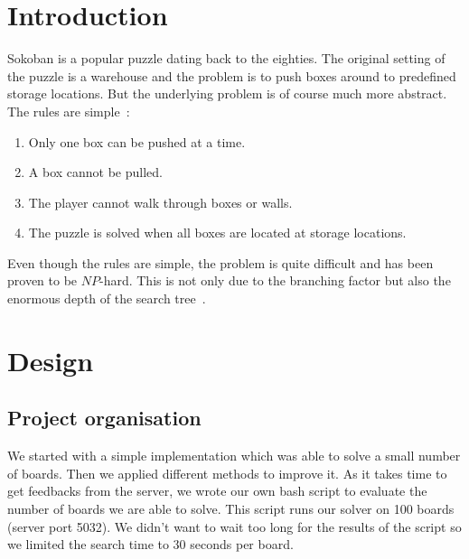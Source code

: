 \documentclass[a4paper,10pt]{article}
\begin{document}
\cleardoublepage
\tableofcontents
\newpage




\section{Introduction}

    Sokoban is a popular puzzle dating back to the eighties.  
    The original setting of the puzzle is a warehouse and the problem is to push boxes
    around to predefined storage locations.  
    But the underlying problem is of course much more abstract.  The rules are simple~\cite{wiki_soko}: 
    \begin{enumerate}[I]
        \item  Only one box can be pushed at a time.
        \item A box cannot be pulled.
        \item The player cannot walk through boxes or walls.
        \item The puzzle is solved when all boxes are located at storage locations.
    \end{enumerate}
    Even though the rules are simple, the problem is quite difficult and has been proven to be $NP$-hard.
    This is not only due to the branching factor but also the 
    enormous depth of the search tree~\cite{wiki_soko}.
    

    
   

\section{Design}
    \subsection{Project organisation}
	We started with a simple implementation which was able to solve a small number of boards. 
	Then we applied different methods to improve it.
	As it takes time to get feedbacks from the server, we wrote our own bash script to evaluate the number of boards we are able to solve.
	This script runs our solver on 100 boards (server port 5032).
	We didn't want to wait too long for the results of the script so we limited the search time to 30 seconds per board.
\end{document}
